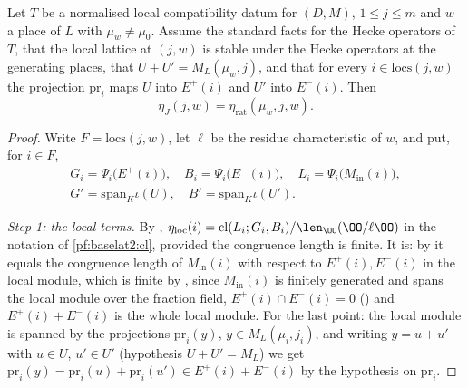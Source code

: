 \begin{theorem}\label{pf:baselat2:etasum}
Let $T$ be a normalised local compatibility datum for $(D,M)$, $1\le j\le m$ and $w$ a place of $L$ with
$\mu_w\neq\mu_0$. Assume the standard facts for the Hecke operators of $T$, that the local lattice at $(j,w)$ is
stable under the Hecke operators at the generating places, that $U+U'=M_L(\mu_w,j)$, and that for every
$i\in\mathrm{locs}(j,w)$ the projection $\mathrm{pr}_i$ maps $U$ into $E^+(i)$ and $U'$ into $E^-(i)$. Then
\[
  \eta_J(j,w)=\eta_{\mathrm{rat}}(\mu_w,j,w).
\]
\end{theorem}

\begin{proof}
Write $F=\mathrm{locs}(j,w)$, let $\ell$ be the residue characteristic of $w$, and put, for $i\in F$,
\begin{gather*}
  G_i=\Psi_i\bigl(E^+(i)\bigr),\quad B_i=\Psi_i\bigl(E^-(i)\bigr),\quad L_i=\Psi_i\bigl(M_{\mathrm{in}}(i)\bigr),\\
  G'=\mathrm{span}_K\iota(U),\quad B'=\mathrm{span}_K\iota(U').
\end{gather*}

\emph{Step 1: the local terms.} By ,
$\eta_{\mathrm{loc}}(i)=\mathrm{cl}(L_i;G_i,B_i)/\len_\OO(\OO/\ell\OO)$ in the notation of \cref{pf:baselat2:cl}, provided the
congruence length is finite. It is: by  it equals the congruence
length of $M_{\mathrm{in}}(i)$ with respect to $E^+(i),E^-(i)$ in the local module, which is finite by
, since $M_{\mathrm{in}}(i)$ is finitely generated and
spans the local module over the fraction field, $E^+(i)\cap E^-(i)=0$
() and $E^+(i)+E^-(i)$ is the whole local module. For the
last point: the local module is spanned by the projections $\mathrm{pr}_i(y)$, $y\in M_L(\mu_i,j_i)$, and writing
$y=u+u'$ with $u\in U$, $u'\in U'$ (hypothesis $U+U'=M_L$) we get $\mathrm{pr}_i(y)=\mathrm{pr}_i(u)+\mathrm{pr}_i(u')\in E^+(i)+E^-(i)$ by the
hypothesis on $\mathrm{pr}_i$.


\end{proof}

